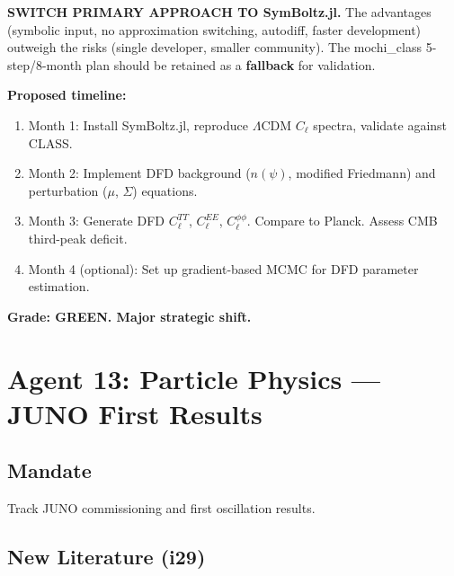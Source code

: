 \documentclass[11pt,a4paper]{article}
\begin{document}
\textbf{SWITCH PRIMARY APPROACH TO SymBoltz.jl.} The advantages (symbolic input, no approximation switching, autodiff, faster development) outweigh the risks (single developer, smaller community). The mochi\_class 5-step/8-month plan should be retained as a \textbf{fallback} for validation.

\textbf{Proposed timeline:}
\begin{enumerate}
\item Month 1: Install SymBoltz.jl, reproduce $\Lambda$CDM $C_\ell$ spectra, validate against CLASS.
\item Month 2: Implement DFD background ($n(\psi)$, modified Friedmann) and perturbation ($\mu$, $\Sigma$) equations.
\item Month 3: Generate DFD $C_\ell^{TT}$, $C_\ell^{EE}$, $C_\ell^{\phi\phi}$. Compare to Planck. Assess CMB third-peak deficit.
\item Month 4 (optional): Set up gradient-based MCMC for DFD parameter estimation.
\end{enumerate}

\textbf{Grade: GREEN. Major strategic shift.}

\section{Agent 13: Particle Physics --- JUNO First Results}

\subsection{Mandate}
Track JUNO commissioning and first oscillation results.

\subsection{New Literature (i29)}
\end{document}
